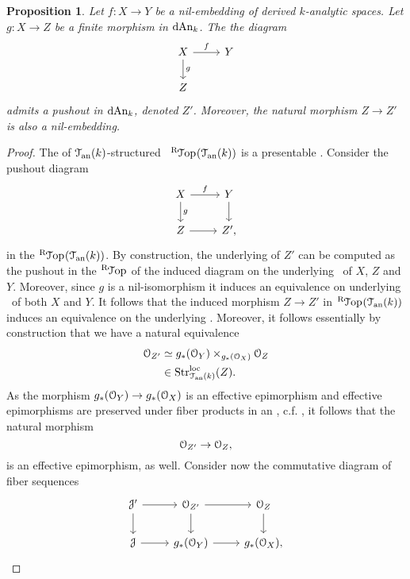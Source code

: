 \documentclass[10pt,a4paper,reqno]{amsart} %
\theoremstyle{plain}
\newtheorem{prop}[thm]{Proposition}
\theoremstyle{definition}
\theoremstyle{remark}
\numberwithin{equation}{section}
\begin{document}
\begin{prop} \label{prop:existence_of_pushouts_along_closed_nil-isomorphisms}
    Let $f \colon X \to Y$ be a nil-embedding of derived $k$-analytic spaces. Let
    $g \colon X \to Z$ be a finite morphism in $\mathrm{dAn}_k$. The the diagram
        \[
        \begin{tikzcd}
            X \ar{r}{f} \ar{d}{g} & Y \\
            Z
        \end{tikzcd}  
        \]
    admits a pushout in $\mathrm{dAn}_k$, denoted $Z'$. Moreover, the natural morphism
    $Z \to Z'$ is also a nil-embedding.
\end{prop}


\begin{proof} The \infcat of $\mathcal T_{\mathrm{an}}(k)$-structured \inftopoi \ $\RTop(\cTank)$ is a presentable \infcat. Consider the pushout diagram
        \[
        \begin{tikzcd}
            X \ar{r}{f} \ar{d}{g} & Y \ar{d} \\
            Z \ar{r} & Z',
        \end{tikzcd}
        \]
    in the \infcat $\RTop(\cTank)$. By construction, the underlying \inftopos of $Z'$ can be computed as the pushout in the \infcat $\RTop$ of
    the induced diagram on the underlying \inftopoi \ of $X$, $Z$ and $Y$. Moreover, since $g$ is a nil-isomorphism it induces an equivalence on underlying \inftopoi \
    of both $X$ and $Y$. It follows that the induced morphism $Z \to Z'$ in $\RTop(\cTank)$ induces an equivalence on the underlying \inftopoi.
    Moreover, it follows essentially by construction that we have a natural equivalence
        \begin{align*}
            \mathcal O_{Z'}  & \simeq g_*(\mathcal O_Y) \times_{g_*(\mathcal O_X)} \mathcal O_Z \\
                      & \in \mathrm{Str}_{\mathcal T_{\mathrm{an}}(k)}^{\mathrm{loc}}(Z).
        \end{align*}
    As the morphism $g_*(\mathcal O_Y) \to g_*(\mathcal O_X)$ is an effective epimorphism and effective epimorphisms are preserved under fiber products in an \inftopos, c.f. \cite[Proposition 6.2.3.15]{HTT},
    it follows that the natural morphism
        \[
            \mathcal O_{Z'} \to \mathcal O_Z,  
        \]
    is an effective epimorphism, as well.
    Consider now the commutative diagram of fiber sequences
        \[
        \begin{tikzcd}
            \cJ ' \ar{r} \ar{d} & \cO_{Z'} \ar{r} \ar{d}  & \cO_Z \ar{d} \\
            \cJ \ar{r} & g_*(\cO_Y) \ar{r} & g_*(\cO_X),

\end{tikzcd}\]
\end{proof}
\end{document}
